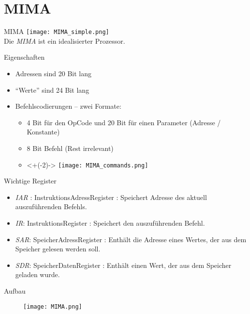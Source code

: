 \section{MIMA}

\begin{frame}{MIMA}
	\texttt{[image: MIMA\_simple.png]}\\
	Die \emph{MIMA} ist ein idealisierter Prozessor. 
\end{frame}

\begin{frame}{Eigenschaften}
	\begin{itemize}[<+->]
		\item Adressen sind 20 Bit lang
		\item \enquote{Werte} sind 24 Bit lang
		\item Befehlscodierungen -- zwei Formate:
		\begin{itemize}
			\item 4 Bit für den OpCode und 20 Bit für einen Parameter (Adresse / Konstante)
			\item 8 Bit Befehl (Rest irrelevant)\\
			\item[]<+(-2)-> \texttt{[image: MIMA\_commands.png]} 
		\end{itemize} 
	\end{itemize}
\end{frame}


\begin{frame}{Wichtige Register}
	\begin{itemize}[<+->]
		\item \emph{IAR} : InstruktionsAdressRegister : Speichert Adresse des aktuell auszuführenden Befehls.
		\item \emph{IR}: InstruktionsRegister : Speichert den auszuführenden Befehl.
		\item \emph{SAR}: SpeicherAdressRegister : Enthält die Adresse eines Wertes, der aus dem Speicher gelesen werden soll.
		\item \emph{SDR}: SpeicherDatenRegister : Enthält einen Wert, der aus dem Speicher geladen wurde.
	\end{itemize}
\end{frame}

\begin{frame}{Aufbau}
	\begin{figure}
		\centering
		\texttt{[image: MIMA.png]}
	\end{figure}
\end{frame}

